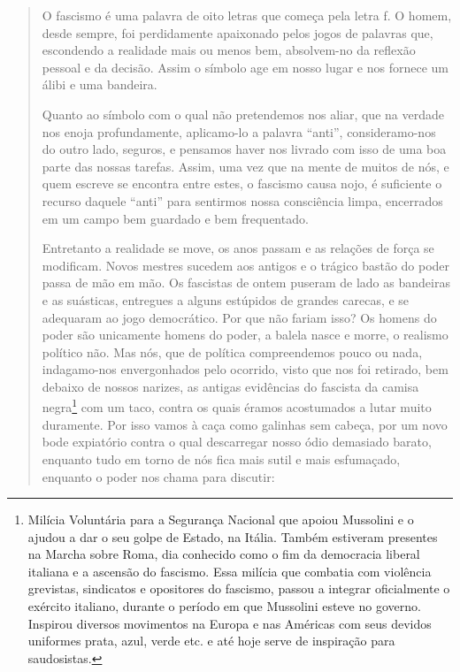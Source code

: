 \begin{quote}




O fascismo é uma palavra de oito letras que começa pela letra f. O
homem, desde sempre, foi perdidamente apaixonado pelos jogos de palavras
que, escondendo a realidade mais ou menos bem, absolvem-no da reflexão
pessoal e da decisão. Assim o símbolo age em nosso lugar e nos fornece
um álibi e uma bandeira.

Quanto ao símbolo com o qual não pretendemos nos aliar, que na verdade
nos enoja profundamente, aplicamo-lo a palavra ``anti'', consideramo-nos
do outro lado, seguros, e pensamos haver nos livrado com isso de uma boa
parte das nossas tarefas. Assim, uma vez que na mente de muitos de nós,
e quem escreve se encontra entre estes, o fascismo causa nojo, é
suficiente o recurso daquele ``anti'' para sentirmos nossa consciência
limpa, encerrados em um campo bem guardado e bem frequentado.

Entretanto a realidade se move, os anos passam e as relações de força se
modificam. Novos mestres sucedem aos antigos e o trágico bastão do poder
passa de mão em mão. Os fascistas de ontem puseram de lado as bandeiras
e as suásticas, entregues a alguns estúpidos de grandes carecas, e se
adequaram ao jogo democrático. Por que não fariam isso? Os homens do
poder são unicamente homens do poder, a balela nasce e morre, o realismo
político não. Mas nós, que de política compreendemos pouco ou nada,
indagamo-nos envergonhados pelo ocorrido, visto que nos foi retirado,
bem debaixo de nossos narizes, as antigas evidências do fascista da
camisa negra\footnote{Milícia Voluntária para a Segurança Nacional que apoiou Mussolini e o
  ajudou a dar o seu golpe de Estado, na Itália. Também estiveram
  presentes na Marcha sobre Roma, dia conhecido como o fim da democracia
  liberal italiana e a ascensão do fascismo. Essa milícia que combatia
  com violência grevistas, sindicatos e opositores do fascismo, passou a
  integrar oficialmente o exército italiano, durante o período em que
  Mussolini esteve no governo. Inspirou diversos movimentos na Europa e
  nas Américas com seus devidos uniformes prata, azul, verde etc. e até
  hoje serve de inspiração para saudosistas.} com um taco, contra os quais éramos acostumados a lutar
muito duramente. Por isso vamos à caça como galinhas sem cabeça, por um
novo bode expiatório contra o qual descarregar nosso ódio demasiado
barato, enquanto tudo em torno de nós fica mais sutil e mais esfumaçado,
enquanto o poder nos chama para discutir:


\end{quote}
